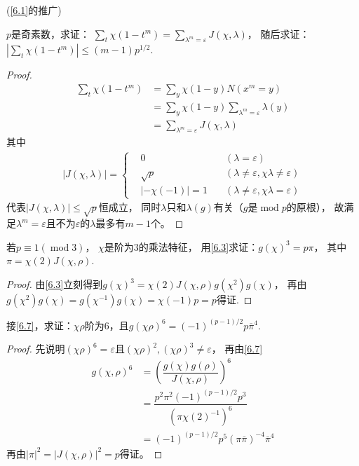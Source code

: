 \begin{exercise}\label{6.6}(\ref{6.1}的推广)\par
    $p$是奇素数，求证：
    $\sum_{t}\chi(1-t^m)=\sum_{\lambda^m=\varepsilon}J(\chi,\lambda)$，
    随后求证：$|\sum_{t}\chi(1-t^m)|\leqslant(m-1)p^{1/2}$.
\end{exercise}
\begin{proof}
    \begin{align*}
        \sum_{t}\chi(1-t^m)
        &=\sum_{y}\chi(1-y)N(x^m=y)\\
        &=\sum_{y}\chi(1-y)\sum_{\lambda^m=\varepsilon}\lambda(y)\\
        &=\sum_{\lambda^m=\varepsilon}J(\chi,\lambda)
    \end{align*}
    其中
    \begin{align*}
        |J(\chi,\lambda)|=
        \left\{ 
        \begin{aligned}
            &0 \quad&(\lambda=\varepsilon)\\
            &\sqrt{p} \quad&(\lambda\neq\varepsilon,\chi\lambda\neq\varepsilon)\\
            &|-\chi(-1)|=1\quad&(\lambda\neq\varepsilon,\chi\lambda=\varepsilon)
        \end{aligned}
         \right.
    \end{align*}
    代表$|J(\chi,\lambda)|\leqslant\sqrt{p}$恒成立，
    同时$\lambda$只和$\lambda(g)$有关（$g$是$\operatorname{mod}p$的原根），
    故满足$\lambda^m=\varepsilon$且不为$\varepsilon$的$\lambda$最多有$m-1$个。
\end{proof}

\begin{exercise}\label{6.7}
    若$p\equiv1(\operatorname{mod}3)$，
    $\chi$是阶为$3$的乘法特征，
    用\ref{6.3}求证：$g(\chi)^3=p\pi$，
    其中$\pi=\chi(2)J(\chi,\rho)$.
\end{exercise}
\begin{proof}
    由\ref{6.3}立刻得到$g(\chi)^3=\chi(2)J(\chi,\rho)g(\chi^2)g(\chi)$，
    再由$g(\chi^2)g(\chi)=g(\chi^{-1})g(\chi)=\chi(-1)p=p$得证.
\end{proof}

\begin{exercise}\label{6.8}
    接\ref{6.7}，求证：$\chi\rho$阶为$6$，且$g(\chi\rho)^6=(-1)^{(p-1)/2}p\overline{\pi}^4$.
\end{exercise}
\begin{proof}
    先说明$(\chi\rho)^6=\varepsilon$且$(\chi\rho)^2,(\chi\rho)^3\neq\varepsilon$，
    再由\ref{6.7}
    \begin{align*}
        g(\chi,\rho)^6&=\left( 
        \dfrac{g(\chi)g(\rho)}{J(\chi,\rho)}
         \right)^6\\
         &=\dfrac{p^2\pi^2(-1)^{(p-1)/2}p^3}{(\pi\chi(2)^{-1})^6}\\
         &=(-1)^{(p-1)/2}p^5(\pi\overline{\pi})^{-4}\overline{\pi}^{4}
    \end{align*}
    再由$|\pi|^2=|J(\chi,\rho)|^2=p$得证。
\end{proof}

